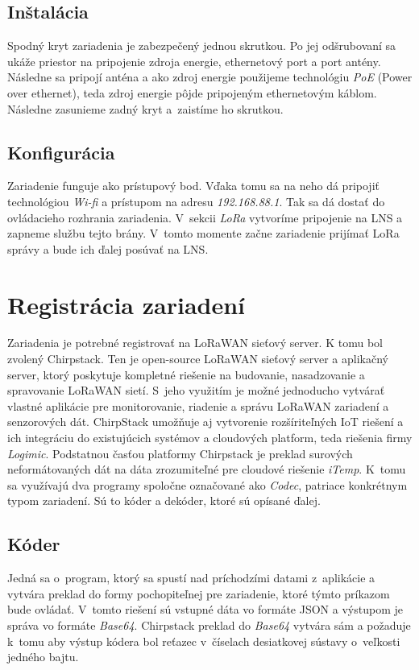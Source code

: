 \subsection*{Inštalácia}
Spodný kryt zariadenia je zabezpečený jednou skrutkou. 
Po jej odšrubovaní sa ukáže priestor na pripojenie zdroja energie, ethernetový port a port antény. 
Následne sa pripojí anténa a ako zdroj energie použijeme technológiu \emph{PoE} (Power over ethernet), teda zdroj energie pôjde pripojeným ethernetovým káblom. Následne zasunieme zadný kryt a~zaistíme ho skrutkou.
\subsection*{Konfigurácia}
Zariadenie funguje ako prístupový bod. Vďaka tomu sa na neho dá pripojiť technológiou \emph{Wi-fi} a prístupom na adresu \emph{192.168.88.1}. 
Tak sa dá dostať do ovládacieho rozhrania zariadenia. V~sekcii \emph{LoRa} vytvoríme pripojenie na LNS a zapneme službu tejto brány. 
V~tomto momente začne zariadenie prijímať LoRa správy a bude ich ďalej posúvať na LNS.  


\section{Registrácia zariadení}\label{impl-Chirp}
 Zariadenia je potrebné registrovať na LoRaWAN sieťový server.
 K tomu bol zvolený Chirpstack.
 Ten je open-source LoRaWAN sieťový server a aplikačný server, ktorý poskytuje kompletné riešenie na budovanie, nasadzovanie a spravovanie LoRaWAN sietí. 
 S~jeho využitím je možné jednoducho vytvárať vlastné aplikácie pre monitorovanie, riadenie a správu LoRaWAN zariadení a senzorových dát.
 ChirpStack umožňuje aj vytvorenie rozšíriteľných IoT riešení a ich integráciu do existujúcich systémov a cloudových platform, teda riešenia firmy \emph{Logimic}. 
 Podstatnou časťou platformy Chirpstack je preklad surových neformátovaných dát na dáta zrozumiteľné pre cloudové riešenie \emph{iTemp}. 
 K~tomu sa využívajú dva programy spoločne označované ako \emph{Codec}, patriace konkrétnym typom zariadení. Sú to kóder a dekóder, ktoré sú opísané ďalej.
\subsection*{Kóder}
Jedná sa o~program, ktorý sa spustí nad príchodzími datami z~aplikácie a vytvára preklad do formy pochopiteľnej pre zariadenie, ktoré týmto príkazom bude ovládať. V~tomto riešení sú vstupné dáta vo formáte JSON a výstupom je správa vo formáte \emph{Base64}. Chirpstack preklad do \emph{Base64} vytvára sám a požaduje k~tomu aby výstup kódera bol reťazec v~číselach desiatkovej sústavy o~veľkosti jedného bajtu.

